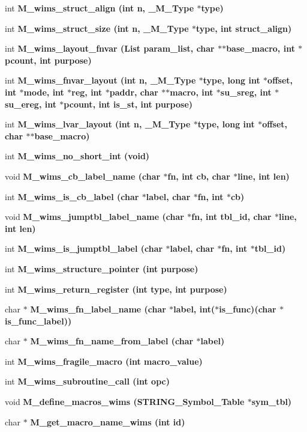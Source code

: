\begin{CompactItemize}
\item 
int \bf{M\_\-wims\_\-struct\_\-align} (int n, \bf{\_\-M\_\-Type} $\ast$type)
\item 
int \bf{M\_\-wims\_\-struct\_\-size} (int n, \bf{\_\-M\_\-Type} $\ast$type, int struct\_\-align)
\item 
int \bf{M\_\-wims\_\-layout\_\-fnvar} (\bf{List} param\_\-list, char $\ast$$\ast$base\_\-macro, int $\ast$pcount, int purpose)
\item 
int \bf{M\_\-wims\_\-fnvar\_\-layout} (int n, \bf{\_\-M\_\-Type} $\ast$type, long int $\ast$offset, int $\ast$\bf{mode}, int $\ast$reg, int $\ast$paddr, char $\ast$$\ast$macro, int $\ast$su\_\-sreg, int $\ast$su\_\-ereg, int $\ast$pcount, int is\_\-st, int purpose)
\item 
int \bf{M\_\-wims\_\-lvar\_\-layout} (int n, \bf{\_\-M\_\-Type} $\ast$type, long int $\ast$offset, char $\ast$$\ast$base\_\-macro)
\item 
int \bf{M\_\-wims\_\-no\_\-short\_\-int} (void)
\item 
void \bf{M\_\-wims\_\-cb\_\-label\_\-name} (char $\ast$fn, int cb, char $\ast$line, int len)
\item 
int \bf{M\_\-wims\_\-is\_\-cb\_\-label} (char $\ast$label, char $\ast$fn, int $\ast$cb)
\item 
void \bf{M\_\-wims\_\-jumptbl\_\-label\_\-name} (char $\ast$fn, int tbl\_\-id, char $\ast$line, int len)
\item 
int \bf{M\_\-wims\_\-is\_\-jumptbl\_\-label} (char $\ast$label, char $\ast$fn, int $\ast$tbl\_\-id)
\item 
int \bf{M\_\-wims\_\-structure\_\-pointer} (int purpose)
\item 
int \bf{M\_\-wims\_\-return\_\-register} (int type, int purpose)
\item 
char $\ast$ \bf{M\_\-wims\_\-fn\_\-label\_\-name} (char $\ast$label, int($\ast$is\_\-func)(char $\ast$is\_\-func\_\-label))
\item 
char $\ast$ \bf{M\_\-wims\_\-fn\_\-name\_\-from\_\-label} (char $\ast$label)
\item 
int \bf{M\_\-wims\_\-fragile\_\-macro} (int macro\_\-value)
\item 
int \bf{M\_\-wims\_\-subroutine\_\-call} (int opc)
\item 
void \bf{M\_\-define\_\-macros\_\-wims} (\bf{STRING\_\-Symbol\_\-Table} $\ast$sym\_\-tbl)
\item 
char $\ast$ \bf{M\_\-get\_\-macro\_\-name\_\-wims} (int id)
\item 
$$
\end{CompactItemize}
